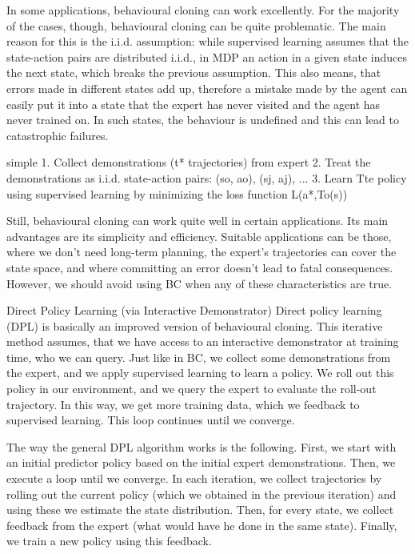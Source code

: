 \documentclass{article}
\begin{document}
In some applications, behavioural cloning can work excellently. For the majority of the cases, though, behavioural cloning can be quite problematic. The main reason for this is the i.i.d. assumption: while supervised learning assumes that the state-action pairs are distributed i.i.d., in MDP an action in a given state induces the next state, which breaks the previous assumption. This also means, that errors made in different states add up, therefore a mistake made by the agent can easily put it into a state that the expert has never visited and the agent has never trained on. In such states, the behaviour is undefined and this can lead to catastrophic failures.

simple
1. Collect demonstrations (t* trajectories) from expert
2. Treat the demonstrations as i.i.d. state-action pairs: (so, ao), (sj, aj), ...
3. Learn Tte policy using supervised learning by minimizing the loss function
L(a*,To(s))

Still, behavioural cloning can work quite well in certain applications. Its main advantages are its simplicity and efficiency. Suitable applications can be those, where we don’t need long-term planning, the expert’s trajectories can cover the state space, and where committing an error doesn’t lead to fatal consequences. However, we should avoid using BC when any of these characteristics are true.

Direct Policy Learning (via Interactive Demonstrator)
Direct policy learning (DPL) is basically an improved version of behavioural cloning. This iterative method assumes, that we have access to an interactive demonstrator at training time, who we can query. Just like in BC, we collect some demonstrations from the expert, and we apply supervised learning to learn a policy. We roll out this policy in our environment, and we query the expert to evaluate the roll-out trajectory. In this way, we get more training data, which we feedback to supervised learning. This loop continues until we converge.

The way the general DPL algorithm works is the following. First, we start with an initial predictor policy based on the initial expert demonstrations. Then, we execute a loop until we converge. In each iteration, we collect trajectories by rolling out the current policy (which we obtained in the previous iteration) and using these we estimate the state distribution. Then, for every state, we collect feedback from the expert (what would have he done in the same state). Finally, we train a new policy using this feedback.
\end{document}
